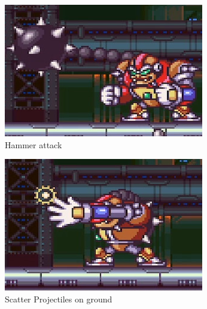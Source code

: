\begin{figure}[htp]
	\centering
	\begin{subfigure}{0.45\linewidth}
		\centering
		\includegraphics[width=\linewidth]{figures/X2/Hunter_stages/Violen_swing.png}
		\caption{Hammer attack}
	\end{subfigure}
	\begin{subfigure}{0.45\linewidth}
		\centering
		\includegraphics[width=\linewidth]{figures/X2/Hunter_stages/Violen_bullet.png}
		\caption{Scatter Projectiles on ground}
	\end{subfigure}
	\begin{subfigure}{0.4\linewidth}
		\centering

\end{subfigure}
\end{figure}

